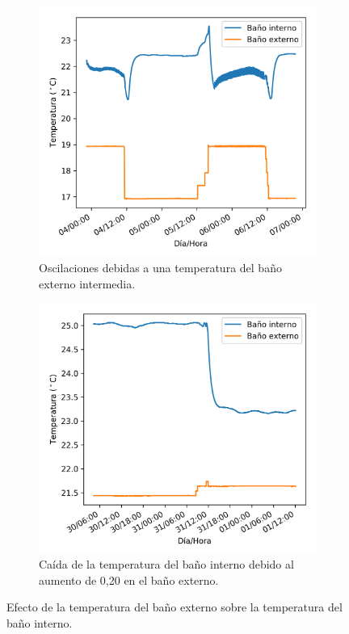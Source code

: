 	\begin{figure}[h]
		\centering
		\begin{subfigure}{0.49\linewidth}
			\includegraphics[width=\linewidth]{../Data/TemperatureStability/temperatureRipple}
			\caption{Oscilaciones debidas a una temperatura del baño externo intermedia.}
			\label{fig: temperatureRipple}
		\end{subfigure}
		\begin{subfigure}{0.49\linewidth}
			\includegraphics[width=\linewidth]{../Data/TemperatureStability/temperatureSensibility}
			\caption{Caída de la temperatura del baño interno debido al aumento de 0,20 \grad{} en el baño externo.}
			\label{fig: temperatureSensibility}
		\end{subfigure}
		\caption{Efecto de la temperatura del baño externo sobre la temperatura del baño interno.}
		\label{fig: externalEffects}
	\end{figure}
	
